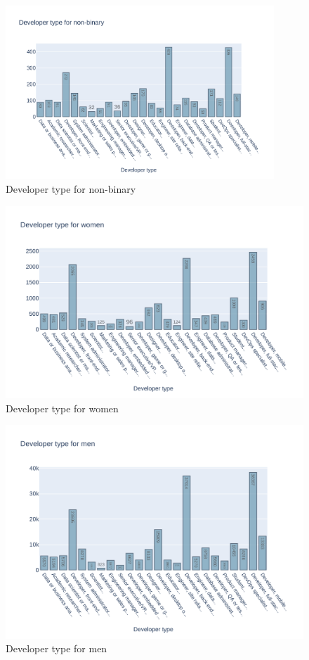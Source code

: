 \documentclass{article}
\begin{document}
\begin{figure}[ht]
    \centering
    \includegraphics[width=0.9\textwidth]{images/nb_devtype.pdf}
    \caption{Developer type for non-binary}
    \label{fig:devtypenb}
\end{figure}{}
\begin{figure}[ht]
    \centering
    \includegraphics[width=\textwidth]{images/women_devtype.pdf}
    \caption{Developer type for women}
    \label{fig:devtypewomen}
\end{figure}{}
\begin{figure}[ht]
    \centering
    \includegraphics[width=\textwidth]{images/men_devtype.pdf}
    \caption{Developer type for men}
    \label{fig:devtypemen}
\end{figure}{}
\end{document}
